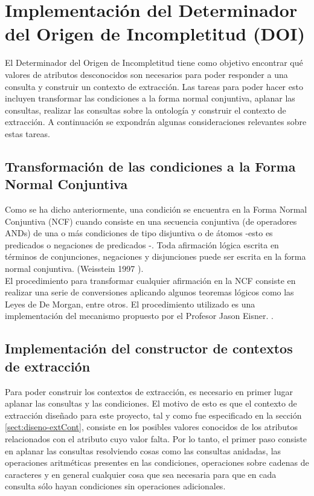 \section{Implementación del Determinador del Origen de Incompletitud (DOI)}\label{sect:implementacion-DOI}

El Determinador del Origen de Incompletitud tiene como objetivo encontrar qué valores de atributos desconocidos son necesarios para poder responder a una consulta y construir un contexto de extracción. Las tareas para poder hacer esto incluyen transformar las condiciones a la forma normal conjuntiva, aplanar las consultas, realizar las consultas sobre la ontología y construir el contexto de extracción. A continuación se expondrán algunas consideraciones relevantes sobre estas tareas. \\ 

\subsection{Transformación de las condiciones a la Forma Normal Conjuntiva}

Como se ha dicho anteriormente, una condición se encuentra en la Forma Normal Conjuntiva (NCF) \cite{normalConjunctiveForm} cuando consiste en una secuencia conjuntiva (de operadores ANDs) de una o más condiciones de tipo disjuntiva o de átomos -esto es predicados o negaciones de predicados -. Toda afirmación lógica escrita en términos de conjunciones, negaciones y disjunciones puede ser escrita en la forma normal conjuntiva. (Weisstein 1997 \cite{normalConjunctiveForm}). \\

El procedimiento para transformar cualquier afirmación en la NCF consiste en realizar una serie de conversiones aplicando algunos teoremas lógicos como las Leyes de De Morgan, entre otros. El procedimiento utilizado es una implementación del mecanismo propuesto por el Profesor Jason Eisner. \cite{normalConjunctiveFormImplementation}. \\

\subsection{Implementación del constructor de contextos de extracción}

Para poder construir los contextos de extracción, es necesario en primer lugar aplanar las consultas y las condiciones. El motivo de esto es que el contexto de extracción diseñado para este proyecto, tal y como fue especificado en la sección \ref{sect:diseno-extCont}, consiste en los posibles valores conocidos de los atributos relacionados con el atributo cuyo valor falta. Por lo tanto, el primer paso consiste en aplanar las consultas resolviendo cosas como las consultas anidadas, las operaciones aritméticas presentes en las condiciones, operaciones sobre cadenas de caracteres y en general cualquier cosa que sea necesaria para que en cada consulta sólo hayan condiciones sin operaciones adicionales. \\

